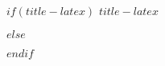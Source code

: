 \pagestyle{empty}
  \begin{spacing}{.75}
  \begin{center}

  \vspace*{3cm}
  
$if(title-latex)$
  \makeatletter \Huge \bfseries \titlefont \textbf{\textsc{$title-latex$}} \par \makeatother    
$else$
  \makeatletter \Huge \bfseries \titlefont \textbf{\textsc{\@title}} \par \makeatother    
$endif$

  \end{center}
  \end{spacing}